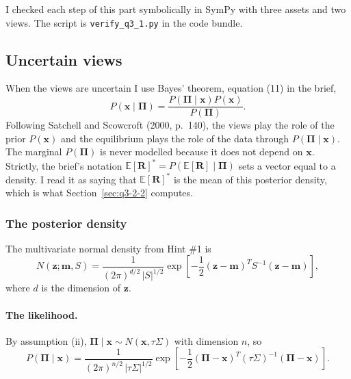 \documentclass[11pt]{article}
\numberwithin{equation}{section}
\begin{document}
I checked each step of this part symbolically in SymPy with three assets and two views. The script is \texttt{verify\_q3\_1.py} in the code bundle.

\subsection{Uncertain views}
\label{sec:q3-2}

When the views are uncertain I use Bayes' theorem, equation (11) in the brief,
\begin{equation}
  P\left(\bm{x} \mid \bm{\Pi}\right) = \frac{P\left(\bm{\Pi} \mid \bm{x}\right) P\left(\bm{x}\right)}{P\left(\bm{\Pi}\right)}.
  \label{eq:q3-bayes}
\end{equation}
Following Satchell and Scowcroft (2000, p.~140), the views play the role of the prior $P(\bm{x})$ and the equilibrium plays the role of the data through $P(\bm{\Pi} \mid \bm{x})$. The marginal $P(\bm{\Pi})$ is never modelled because it does not depend on $\bm{x}$. Strictly, the brief's notation $\mathbb{E}[\bm{R}]^{*} = P(\mathbb{E}[\bm{R}] \mid \bm{\Pi})$ sets a vector equal to a density. I read it as saying that $\mathbb{E}[\bm{R}]^{*}$ is the mean of this posterior density, which is what Section~\ref{sec:q3-2-2} computes.

\subsubsection{The posterior density}
\label{sec:q3-2-1}

The multivariate normal density from Hint \#1 is
\begin{equation*}
  N\left(\bm{z}; \bm{m}, S\right) = \frac{1}{(2\pi)^{d/2}\,|S|^{1/2}}\exp\left[-\frac{1}{2}\left(\bm{z} - \bm{m}\right)^{T}S^{-1}\left(\bm{z} - \bm{m}\right)\right],
\end{equation*}
where $d$ is the dimension of $\bm{z}$.

\paragraph{The likelihood.}
By assumption (ii), $\bm{\Pi} \mid \bm{x} \sim N(\bm{x}, \tau\Sigma)$ with dimension $n$, so
\begin{equation*}
  P\left(\bm{\Pi} \mid \bm{x}\right) = \frac{1}{(2\pi)^{n/2}\,|\tau\Sigma|^{1/2}}\exp\left[-\frac{1}{2}\left(\bm{\Pi} - \bm{x}\right)^{T}(\tau\Sigma)^{-1}\left(\bm{\Pi} - \bm{x}\right)\right].
\end{equation*}
\end{document}
